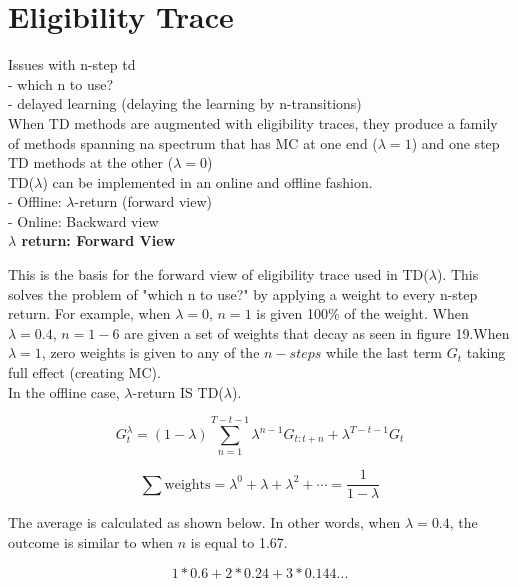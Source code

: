 \documentclass{article}
\begin{document}
\newpage
\section{Eligibility Trace}

 Issues with n-step td\\
- which n to use?\\
- delayed learning (delaying the learning by n-transitions)\\

\noindent
When TD methods are augmented with eligibility traces, they produce a family of
methods spanning na spectrum that has MC at one end ($\lambda = 1$) and one step
TD methods at the other ($\lambda = 0$)\\

\noindent
TD($\lambda$) can be implemented in an online and offline fashion.\\
- Offline: $\lambda$-return (forward view)\\
- Online: Backward view\\

\noindent
\textbf{$\lambda$ return: Forward View}

\noindent
This is the basis for the forward view of eligibility trace used in
TD($\lambda$). This solves the problem of "which n to use?" by applying a weight
to every n-step return. For example, when $\lambda = 0$, $n=1$ is given 100\% of
the weight. When $\lambda=0.4$, $n=1-6$ are given a set of weights that decay as
seen in figure 19.When $\lambda = 1$, zero weights is given to any of the
$n-steps$ while the last term $G_{t}$ taking full effect (creating MC).\\

\noindent
In the offline case, $\lambda$-return IS TD($\lambda$).

\begin{equation}
G_{t}^{\lambda}=(1-\lambda) \sum_{n=1}^{T-t-1} \lambda^{n-1} G_{t: t+n}+\lambda^{T-t-1} G_{t}
\end{equation}

\begin{equation}
\sum \text {weights}=\lambda^{0}+\lambda+\lambda^{2}+\cdots=\frac{1}{1-\lambda}
\end{equation}

\noindent
The average is calculated as shown below. In other words, when $\lambda = 0.4$,
the outcome is similar to when $n$ is equal to 1.67.

\begin{equation}
1*0.6 + 2*0.24 + 3*0.144 ... 
\end{equation}
\end{document}

